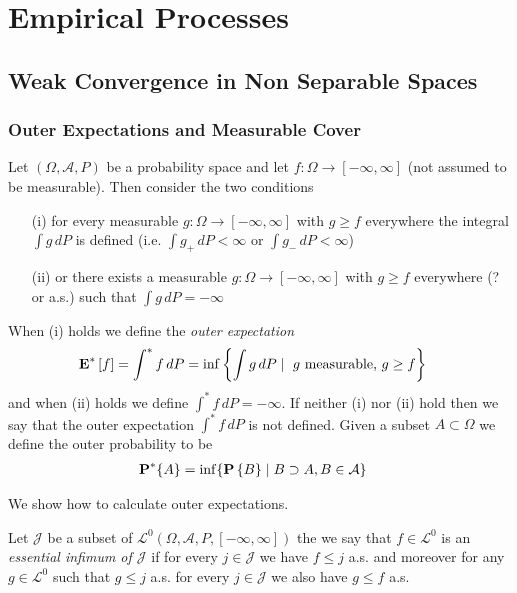 \chapter{Empirical Processes}

\section{Weak Convergence in Non Separable Spaces}

\subsection{Outer Expectations and Measurable Cover}

\begin{defn}Let $(\Omega, \mathcal{A}, P)$ be a probability space and let $f : \Omega \to [-\infty, \infty]$ (not assumed to be measurable).  Then consider the two conditions
\begin{itemize}
\item [(i)] for every measurable $g : \Omega \to [-\infty, \infty]$ with $g \geq f$ everywhere the integral $\int g \, dP$ is defined (i.e. $\int g_+ \, dP < \infty$ or $\int g_- \, dP < \infty$) 
\item [(ii)] or there exists a measurable $g : \Omega \to [-\infty, \infty]$  with $g \geq f$ everywhere (? or a.s.) such that $\int g \, dP = -\infty$ 
\end{itemize}
When (i) holds we define the \emph{outer expectation}
\begin{align*}
\textbf{E}^*\left[f\right] &= \int^* f \, dP = \inf \left \lbrace \int g  \, dP \mid \text{ $g$ measurable, } g \geq f \right \rbrace
\end{align*}
and when (ii) holds we define $\int^* f \, dP = -\infty$.
If neither (i) nor (ii) hold then we say that the outer expectation $\int^* f \, dP$ is not defined.  Given a subset $A \subset \Omega$ we define the outer probability to be
\begin{align*}
\textbf{P}^*\{A\} &= \inf \lbrace \textbf{P}\left \{B \right \} \mid B \supset A, B \in \mathcal{A} \rbrace
\end{align*}
\end{defn}

We show how to calculate outer expectations.
\begin{defn}Let $\mathcal{J}$ be a subset of $\mathcal{L}^0(\Omega, \mathcal{A}, P, [-\infty, \infty])$ the we say that $f \in \mathcal{L}^0$ is an \emph{essential infimum of $\mathcal{J}$} if 
for every $j \in \mathcal{J}$ we have $f \leq j$ a.s. and moreover for any $g \in \mathcal{L}^0$ such that $g \leq j$ a.s. for every $j \in \mathcal{J}$ we also have $g \leq f$ a.s.
\end{defn}

